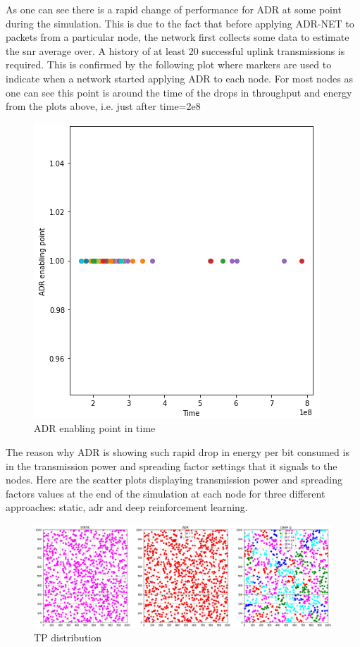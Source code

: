 As one can see there is a rapid change of performance for
ADR at some point during the simulation. This is due to
the fact that before applying ADR-NET to packets from a
particular node, the network first collects some data
to estimate the snr average over. A history of at least 20 successful uplink transmissions is required. This is 
confirmed by the following plot where markers are used 
to indicate when a network started applying ADR to each 
node. For most nodes as one can see this point is around
the time of the drops in throughput and energy from the plots above, i.e. just after time=2e8

\begin{figure}[H]
\centering
\hspace*{-0.5cm}  
\includegraphics[scale=0.50]{plots/adr/adr_enabling_point.PNG}
  \caption{ADR enabling point in time}
\end{figure}

The reason why ADR is showing such rapid drop in energy
per bit consumed is in the transmission power and 
spreading factor settings that it signals to the nodes.
Here are the scatter plots displaying transmission power and spreading factors values at the end of the simulation
at each node for three different approaches: static, adr 
and deep reinforcement learning.

\begin{figure}[H]
\centering
\hspace*{-2.5cm}  
\includegraphics[scale=0.45]{plots/adr/adr_tp_distro.png} 
\caption{TP distribution}
\end{figure}

